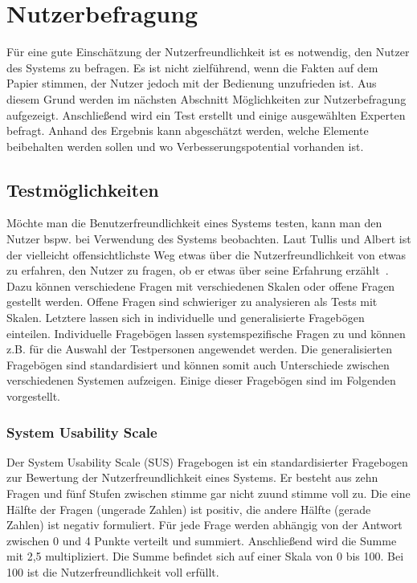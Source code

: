 \section{Nutzerbefragung}
\label{6:Nutzerbefragung}
Für eine gute Einschätzung der Nutzerfreundlichkeit ist es notwendig, den Nutzer des Systems zu befragen. Es ist nicht zielführend, wenn die Fakten auf dem Papier stimmen, der Nutzer jedoch mit der Bedienung unzufrieden ist. Aus diesem Grund werden im nächsten Abschnitt Möglichkeiten zur Nutzerbefragung aufgezeigt. Anschließend wird ein Test erstellt und einige ausgewählten Experten befragt. Anhand des Ergebnis kann abgeschätzt werden, welche Elemente beibehalten werden sollen und wo Verbesserungspotential vorhanden ist.

\subsection{Testmöglichkeiten}
Möchte man die Benutzerfreundlichkeit eines Systems testen, kann man den Nutzer bspw. bei Verwendung des Systems beobachten. Laut Tullis und Albert ist \glqq der vielleicht offensichtlichste Weg etwas über die Nutzerfreundlichkeit von etwas zu erfahren, den Nutzer zu fragen, ob er etwas über seine Erfahrung erzählt\grqq \ \citep[123]{Tullis2008}. Dazu können verschiedene Fragen mit verschiedenen Skalen oder offene Fragen gestellt werden. Offene Fragen sind schwieriger zu analysieren als Tests mit Skalen. Letztere lassen sich in individuelle und generalisierte Fragebögen einteilen. Individuelle Fragebögen lassen systemspezifische Fragen zu und können z.B. für die Auswahl der Testpersonen angewendet werden. Die generalisierten Fragebögen sind standardisiert und können somit auch Unterschiede zwischen verschiedenen Systemen aufzeigen. Einige dieser Fragebögen sind im Folgenden vorgestellt.

\subsubsection*{System Usability Scale}
Der System Usability Scale (SUS) Fragebogen ist ein standardisierter Fragebogen zur Bewertung der Nutzerfreundlichkeit eines Systems. Er besteht aus zehn Fragen und fünf Stufen zwischen \glqq stimme gar nicht zu\grqq und \glqq stimme voll zu\grqq. Die eine Hälfte der Fragen (ungerade Zahlen) ist positiv, die andere Hälfte (gerade Zahlen) ist negativ formuliert. Für jede Frage werden abhängig von der Antwort zwischen 0 und 4 Punkte verteilt und summiert. Anschließend wird die Summe mit 2,5 multipliziert. Die Summe befindet sich auf einer Skala von 0 bis 100. Bei 100 ist die Nutzerfreundlichkeit voll erfüllt. 

